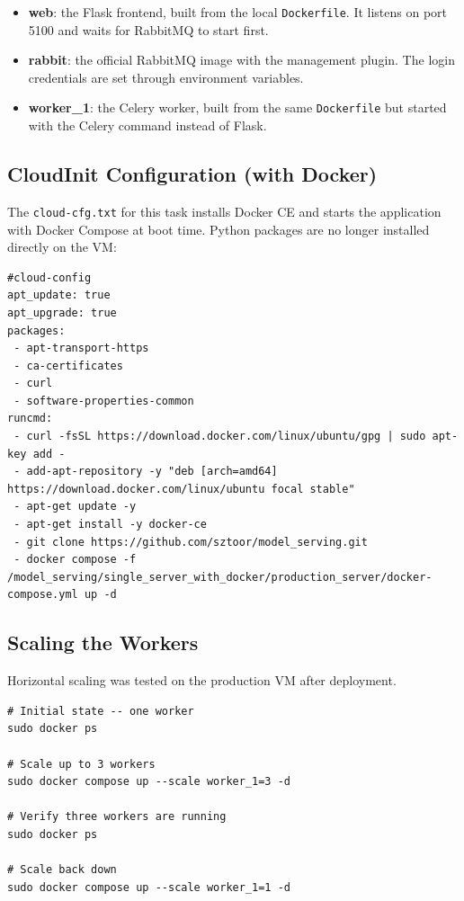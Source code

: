 \documentclass[11pt,a4paper]{article}
\begin{document}
\begin{itemize}[leftmargin=1.5cm]
  \item \textbf{web}: the Flask frontend, built from the local \texttt{Dockerfile}.
        It listens on port 5100 and waits for RabbitMQ to start first.
  \item \textbf{rabbit}: the official RabbitMQ image with the management plugin.
        The login credentials are set through environment variables.
  \item \textbf{worker\_1}: the Celery worker, built from the same \texttt{Dockerfile}
        but started with the Celery command instead of Flask.
\end{itemize}

\subsection{CloudInit Configuration (with Docker)}

The \texttt{cloud-cfg.txt} for this task installs Docker CE and starts the
application with Docker Compose at boot time. Python packages are no longer
installed directly on the VM:

\begin{lstlisting}[style=yaml, caption={cloud-cfg.txt -- single server with Docker}]
#cloud-config
apt_update: true
apt_upgrade: true
packages:
 - apt-transport-https
 - ca-certificates
 - curl
 - software-properties-common
runcmd:
 - curl -fsSL https://download.docker.com/linux/ubuntu/gpg | sudo apt-key add -
 - add-apt-repository -y "deb [arch=amd64] https://download.docker.com/linux/ubuntu focal stable"
 - apt-get update -y
 - apt-get install -y docker-ce
 - git clone https://github.com/sztoor/model_serving.git
 - docker compose -f /model_serving/single_server_with_docker/production_server/docker-compose.yml up -d
\end{lstlisting}

\subsection{Scaling the Workers}

Horizontal scaling was tested on the production VM after deployment.

\begin{lstlisting}[style=shell, caption={Scaling Celery workers from 1 to 3}]
# Initial state -- one worker
sudo docker ps

# Scale up to 3 workers
sudo docker compose up --scale worker_1=3 -d

# Verify three workers are running
sudo docker ps

# Scale back down
sudo docker compose up --scale worker_1=1 -d
\end{lstlisting}
\end{document}
